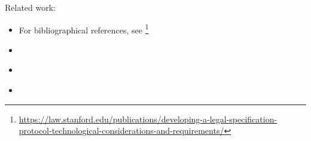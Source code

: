Related work:

\begin{itemize}
\item For bibliographical references, see
  \footnote{\url{https://law.stanford.edu/publications/developing-a-legal-specification-protocol-technological-considerations-and-requirements/}}
\item \cite{sergot_kowalski_etal__british_nationality_acm_1986,kowalski_legislation_logic_programs_1995}
\item \cite{libal_steen_nai_suite_draft_reason_legal_texts_jurix_2019}
\item \cite{governatori_carnead_defeas_logic_icail_2011}
\end{itemize}



